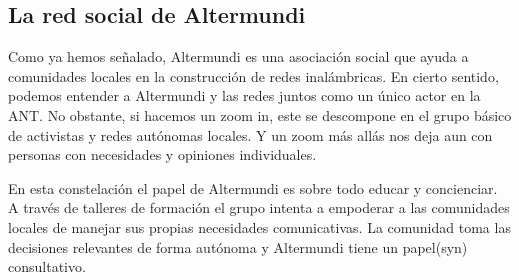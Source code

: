 \subsection{La red social de Altermundi}

Como ya hemos señalado, Altermundi es una asociación social que ayuda a comunidades locales en la construcción de redes inalámbricas.
En cierto sentido, podemos entender a Altermundi y las redes juntos como un único actor en la ANT.
No obstante, si hacemos un zoom in, este se descompone en el grupo básico de activistas y redes autónomas locales.
Y un zoom más allás nos deja aun con personas con necesidades y opiniones individuales.

En esta constelación el papel de Altermundi es sobre todo educar y concienciar.
A través de talleres de formación el grupo intenta a empoderar a las comunidades locales de manejar sus propias necesidades comunicativas.
La comunidad toma las decisiones relevantes de forma autónoma y Altermundi tiene un papel(syn) consultativo.


